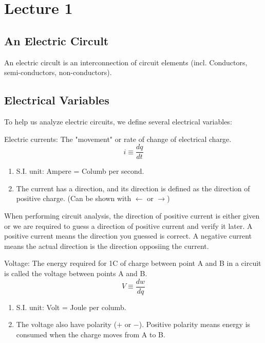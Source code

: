 \documentclass{article}
\begin{document}
\tableofcontents
\section{Lecture 1}
\subsection{An Electric Circult}
    An electric circult is an interconnection of circuit elements (incl. Conductors, semi-conductors, non-conductors). 

\subsection{Electrical Variables}
    To help us analyze electric circuits, we define several electrical variables:
    \begin{definition}
        Electric currents: The "movement" or rate of change of electrical charge. 
        \begin{equation}
            i\equiv\frac{dq}{dt}
        \end{equation} 
        
        \begin{enumerate}
            \item S.I. unit: Ampere = Columb per second.
            \item The current has a direction, and its direction is defined as the direction of positive charge. (Can be shown with $\leftarrow$ or $\rightarrow$)
        \end{enumerate}
    \end{definition}
    When performing circuit analysis, the direction of positive current is either given or we are required to guess a direction of positive current and verify it later. A positive current means the direction you guessed is correct. A negative current means the actual direction is the direction opposiing the current.
    \begin{definition}
        Voltage: The energy required for 1C of charge between point A and B in a circuit is called the voltage between points A and B. 
        \begin{equation}
            V\equiv\frac{dw}{dq}
        \end{equation} 
        \begin{enumerate}
            \item S.I. unit: Volt = Joule per columb.
            \item The voltage also have polarity ($+$ or $-$). Positive polarity means energy is consumed when the charge moves from A to B.
        \end{enumerate}
    \end{definition}
\end{document}
